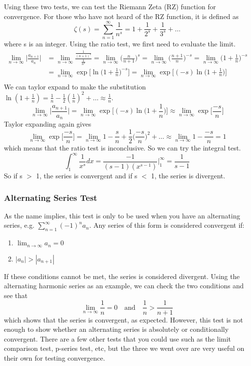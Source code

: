 \documentclass{article}
\newcommand{\be}{\begin{equation}}
\newcommand{\ee}{\end{equation}}
\begin{document}
Using these two tests, we can test the Riemann Zeta (RZ) function for convergence.
For those who have not heard of the RZ function, it is defined as
\be
\zeta(s) = \sum_{n=1}^{\infty} \frac{1}{n^s} = 1 + \frac{1}{2^s} + \frac{1}{3^s}+ \hdots
\ee
where s is an integer.
Using the ratio test, we first need to evaluate the limit.
\begin{align}
\lim_{n \to \infty} \Big| \frac{a_{n+1}}{a_n} \Big| &= \lim_{n \to \infty} \frac{\frac{1}{(n+1)^s}}{\frac{1}{n^s}} = \lim_{n \to \infty} \Big( \frac{n}{n+1} \Big) ^s
= \lim_{n \to \infty} \Big( \frac{n+1}{n} \Big) ^{-s} = \lim_{n \to \infty} \Big( 1 + \frac{1}{n} \Big) ^{-s} \\
&= \lim_{n \to \infty} \exp \Big[ \ln \Big( 1 + \frac{1}{n} \Big) ^{-s} \Big] = \lim_{n \to \infty} \exp \Big[ (-s) \ln \Big( 1 + \frac{1}{n} \Big) \Big] \\
\end{align}
We can taylor expand to make the substitution $\ln(1 + \frac{1}{n}) = \frac{1}{n} - \frac{1}{2}(\frac{1}{n})^2 + \hdots \approx \frac{1}{n}$.
\be
\lim_{n \to \infty} \Big| \frac{a_{n+1}}{a_n} \Big| = \lim_{n \to \infty} \exp \Big[ (-s) \ln \Big( 1 + \frac{1}{n} \Big) \Big] \approx \lim_{n \to \infty} \exp \Big[ \frac{-s}{n} \Big]
\ee
Taylor expanding again gives
\be
\lim_{n \to \infty} \exp \Big[ \frac{-s}{n} \Big] = \lim_{n \to \infty} 1 - \frac{s}{n} + \frac{1}{2} \Big( \frac{-s}{n} \Big)^2 + \hdots \approx \lim_{n \to \infty} 1 - \frac{-s}{n} = 1
\ee
which means that the ratio test is inconclusive. So we can try the integral test.
\be
\int_{1}^{\infty} \frac{1}{x^s} dx = \frac{-1}{(s-1)(x^{s-1})} \Big\vert_{1}^{\infty} = \frac{1}{s-1}
\ee
So if s $>$ 1, the series is convergent and if s $<$ 1, the series is divergent.
\subsubsection*{Alternating Series Test}
As the name implies, this test is only to be used when you have an alternating series, e.g. $\sum\limits_{n=1}^{\infty} (-1)^n a_n$.
Any series of this form is considered convergent if:
\begin{enumerate}
  \item $\lim_{n \to \infty} a_n = 0$
  \item $|a_n| > |a_{n+1}|$
\end{enumerate}
If these conditions cannot be met, the series is considered divergent.
Using the alternating harmonic series as an example, we can check the two conditions and see that
\be
\lim_{n \to \infty} \frac{1}{n} = 0 \quad \text{and} \quad \frac{1}{n} > \frac{1}{n+1}
\ee
which shows that the series is convergent, as expected.
However, this test is not enough to show whether an alternating series is absolutely or conditionally convergent.
There are a few other tests that you could use such as the limit comparison test, p-series test, etc, but the three we went over are very useful on their own for testing convergence.
\end{document}
